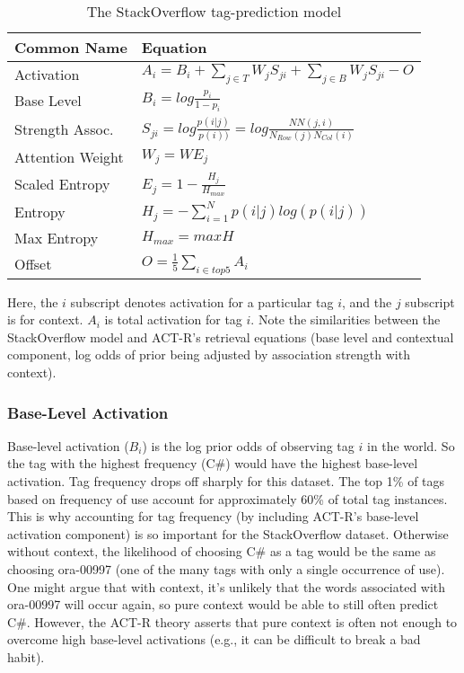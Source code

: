 \documentclass[10pt,letterpaper]{article}
\begin{document}
\renewcommand{\arraystretch}{1.5}%
\renewcommand{\tabcolsep}{.5mm}
\begin{table}[!ht]
  \begin{center} 
    \caption{The StackOverflow tag-prediction model} 
    \label{sample-table} 
    \vskip 0.12in
    \begin{tabular}{ll} 
      \hline
      Common Name &  Equation \\
      \hline
      Activation & 		$A_{i} = B_{i} + \sum_{j\in T}^{ } W_{j} S_{ji} + \sum_{j\in B}^{ } W_{j} S_{ji} - O$ \\
      Base Level & 		$B_{i} = log \frac{p_{i}}{1-p_{i}}$ \\
      Strength Assoc. &		$S_{ji} = log \frac{p(i|j)}{p(i))} = log \frac{NN(j,i)}{N_{Row}(j)N_{Col}(i)}$ \\
      Attention Weight	& 	$W_{j} = WE_{j}$ \\
      Scaled Entropy & 		$E_{j} = 1-\frac{H_{j}}{H_{max}}$ \\
      Entropy & 		$H_{j} = -\sum_{i=1}^{N}p(i|j)log\left (  p(i|j) \right )$ \\
      Max Entropy & 		$H_{max} = maxH$ \\
      Offset & 			$O = \frac{1}{5}\sum_{i\in top 5}^{ } A_{i}$ \\
      \hline
    \end{tabular} 
  \end{center} 
\end{table}

Here, the $i$ subscript denotes activation for a particular tag $i$, and the $j$ subscript is for context.
$A_{i}$ is total activation for tag $i$.
Note the similarities between the StackOverflow model and ACT-R's retrieval equations (base level and contextual component, log odds of prior being adjusted by association strength with context).

\subsubsection{Base-Level Activation}

Base-level activation ($B_{i}$) is the log prior odds of observing tag $i$ in the world.
So the tag with the highest frequency (C\#) would have the highest base-level activation.
Tag frequency drops off sharply for this dataset.
The top 1\% of tags based on frequency of use account for approximately 60\% of total tag instances.
This is why accounting for tag frequency (by including ACT-R's base-level activation component) is so important for the StackOverflow dataset.
Otherwise without context, the likelihood of choosing C\# as a tag would be the same as choosing ora-00997 (one of the many tags with only a single occurrence of use).
One might argue that with context, it's unlikely that the words associated with ora-00997 will occur again, so pure context would be able to still often predict C\#.
However, the ACT-R theory asserts that pure context is often not enough to overcome high base-level activations (e.g., it can be difficult to break a bad habit).
\end{document}
